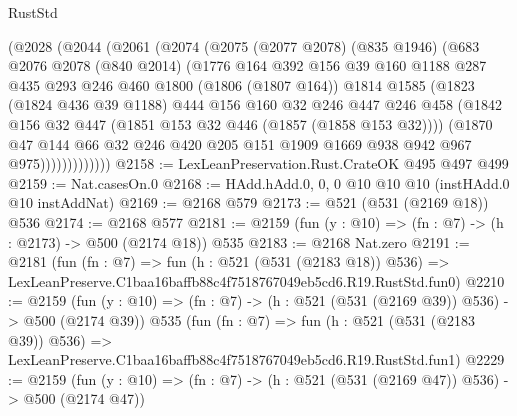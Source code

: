 \begin{lexlean}{RustStd}
\begin{coremodule}
            (@2028
              (@2044
                (@2061
                  (@2074
                    (@2075
                      (@2077 @2078)
                      (@835 @1946)
                      (@683
                        @2076
                        @2078
                        (@840 @2014)
                        (@1776
                          @164
                          @392
                          @156
                          @39
                          @160
                          @1188
                          @287
                          @435
                          @293
                          @246
                          @460
                          @1800
                          (@1806 (@1807 @164))
                          @1814
                          @1585
                          (@1823
                            (@1824 @436 @39 @1188)
                            @444
                            @156
                            @160
                            @32
                            @246
                            @447
                            @246
                            @458
                            (@1842 @156 @32 @447 (@1851 @153 @32 @446 (@1857 (@1858 @153 @32))))
                            (@1870
                              @47
                              @144
                              @66
                              @32
                              @246
                              @420
                              @205
                              @151
                              @1909
                              @1669
                              @938
                              @942
                              @967
                              @975)))))))))))))
@2158 := LexLeanPreservation.Rust.CrateOK @495 @497 @499
@2159 := Nat.casesOn.{0}
@2168 := HAdd.hAdd.{0, 0, 0} @10 @10 @10 (instHAdd.{0} @10 instAddNat)
@2169 := @2168 @579
@2173 := @521 (@531 (@2169 @18)) @536
@2174 := @2168 @577
@2181 := @2159 (fun (y : @10) => (fn : @7) -> (h : @2173) -> @500 (@2174 @18)) @535
@2183 := @2168 Nat.zero
@2191 := @2181
    (fun (fn : @7) =>
    fun (h : @521 (@531 (@2183 @18)) @536) =>
    LexLeanPreserve.C1baa16baffb88c4f7518767049eb5cd6.R19.RustStd.fun0)
@2210 := @2159
    (fun (y : @10) => (fn : @7) -> (h : @521 (@531 (@2169 @39)) @536) -> @500 (@2174 @39))
    @535
    (fun (fn : @7) =>
    fun (h : @521 (@531 (@2183 @39)) @536) =>
    LexLeanPreserve.C1baa16baffb88c4f7518767049eb5cd6.R19.RustStd.fun1)
@2229 := @2159
    (fun (y : @10) => (fn : @7) -> (h : @521 (@531 (@2169 @47)) @536) -> @500 (@2174 @47))

\end{coremodule}
\end{lexlean}
